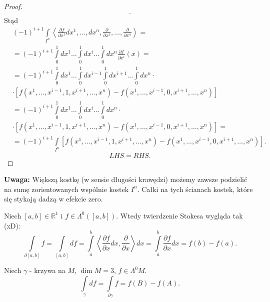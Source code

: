\documentclass[../main.tex]{subfiles}
\begin{document}
\begin{proof}
\begin{align*}
.\end{align*}
Stąd
\begin{align*}
    &(-1)^{i+1} \int\limits_{I^n}\left< \frac{\partial f}{\partial x^1} dx^1,\ldots,dx^n, \frac{\partial }{\partial x^1} , \ldots, \frac{\partial }{\partial x^n}  \right> = \\
    &= (-1)^{i+1} \int\limits_0^1dx^1\ldots\int\limits_0^1 dx^i\ldots\int\limits_0^1dx^n \frac{\partial f}{\partial x^i} (x) =\\
    &= (-1)^{i+1} \int\limits_0^1dx^1\ldots\int\limits_0^1dx^{i-1}\int\limits_0^1dx^{i+1}\ldots\int\limits_0^1dx^n\cdot  \\
    &\cdot \left[ f(x^1,\ldots,x^{i-1},1,x^{i+1},\ldots,x^n) - f(x^1,\ldots,x^{i-1}, 0, x^{i+1}, \ldots, x^n) \right]  \\
    &= (-1)^{i+1}\int\limits_0^1dx^1\ldots\int\limits_0^1dx^i\ldots\int\limits_0^1dx^n\cdot \\
    &\cdot \left[ f(x^1,\ldots,x^{i-1},1,x^{i+1},\ldots,x^n) - f(x^1,\ldots,x^{i-1}, 0, x^{i+1}, \ldots, x^n) \right] = \\
    &= (-1)^{i+1} \int\limits_{I^n}\left[ f(x^1,\ldots,x^{i-1},1,x^{i+1},\ldots,x^n) - f(x^1,\ldots,x^{i-1},0,x^{i+1},\ldots,x^n) \right]
.\end{align*}
\[
LHS = RHS
.\]
\end{proof}
\textbf{Uwaga:} Większą kostkę (w sensie długości krawędzi) możemy zawsze podzielić na sumę zorientowanych wspólnie kostek $I^n$. Całki na tych ścianach kostek, które się stykają dadzą w efekcie zero.
\begin{przyklad}
    Niech $[a,b]\in \mathbb{R}^1$ i $f\in \Lambda^0\left( [a,b] \right) $. Wtedy twierdzenie Stokesa wygląda tak (xD):
    \[
        \int\limits_{\partial[a,b]} f= \int\limits_{[a,b]} df = \int\limits_a^b \left<\frac{\partial f}{\partial x}dx , \frac{\partial }{\partial x}  \right>dx = \int\limits_a^b \frac{\partial f}{\partial x} dx = f(b) - f(a)
    .\]
\end{przyklad}
\begin{przyklad}
    Niech $\gamma$ - krzywa na $M$, $\dim M = 3$, $f \in \Lambda^0M$.
     \[
         \int\limits_\gamma df= \int\limits_{\partial \gamma} f = f(B) - f(A)
    .\]
\end{przyklad}
\end{document}
